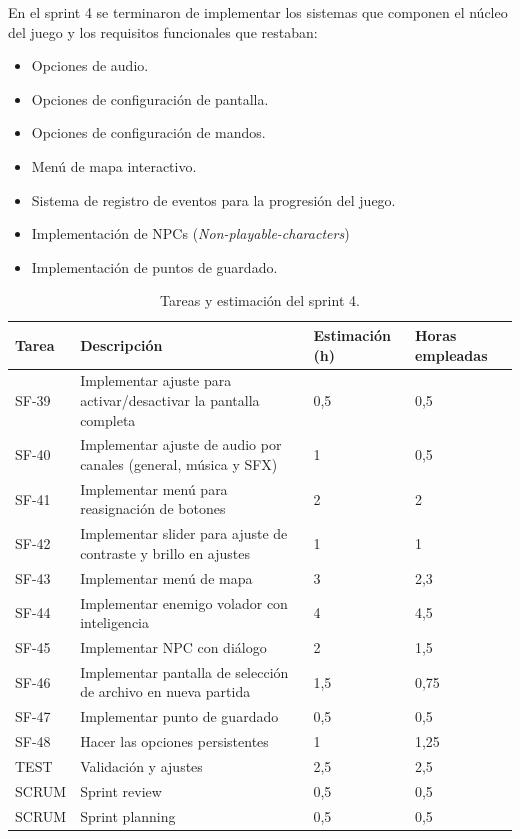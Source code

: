 En el sprint 4 se terminaron de implementar los sistemas que componen el núcleo del juego y los requisitos funcionales que restaban:
\begin{itemize}
    \item Opciones de audio.
    \item Opciones de configuración de pantalla.
    \item Opciones de configuración de mandos.
    \item Menú de mapa interactivo.
    \item Sistema de registro de eventos para la progresión del juego.
    \item Implementación de NPCs (\textit{Non-playable-characters})
    \item Implementación de puntos de guardado.
\end{itemize}

\begin{table}[!ht]
    \centering
    \begin{tabular}{|l|p{8cm}|p{2cm}|p{2cm}|}
    \hline
        Tarea & Descripción & Estimación (h) & Horas empleadas \\ \hline
        SF-39 & Implementar ajuste para activar/desactivar la pantalla completa & 0,5 & 0,5 \\ \hline
        SF-40 & Implementar ajuste de audio por canales (general, música y SFX) & 1 & 0,5 \\ \hline
        SF-41 & Implementar menú para reasignación de botones & 2 & 2 \\ \hline
        SF-42 & Implementar slider para ajuste de contraste y brillo en ajustes & 1 & 1 \\ \hline
        SF-43 & Implementar menú de mapa & 3 & 2,3 \\ \hline
        SF-44 & Implementar enemigo volador con inteligencia & 4 & 4,5 \\ \hline
        SF-45 & Implementar NPC con diálogo & 2 & 1,5 \\ \hline
        SF-46 & Implementar pantalla de selección de archivo en nueva partida & 1,5 & 0,75 \\ \hline
        SF-47 & Implementar punto de guardado & 0,5 & 0,5 \\ \hline
        SF-48 & Hacer las opciones persistentes & 1 & 1,25 \\ \hline
        TEST & Validación y ajustes & 2,5 & 2,5 \\ \hline
        SCRUM & Sprint review & 0,5 & 0,5 \\ \hline
        SCRUM & Sprint planning & 0,5 & 0,5 \\ \hline
    \end{tabular}
    \caption{Tareas y estimación del sprint 4.}
    \label{tab:sprint4task}
\end{table}

